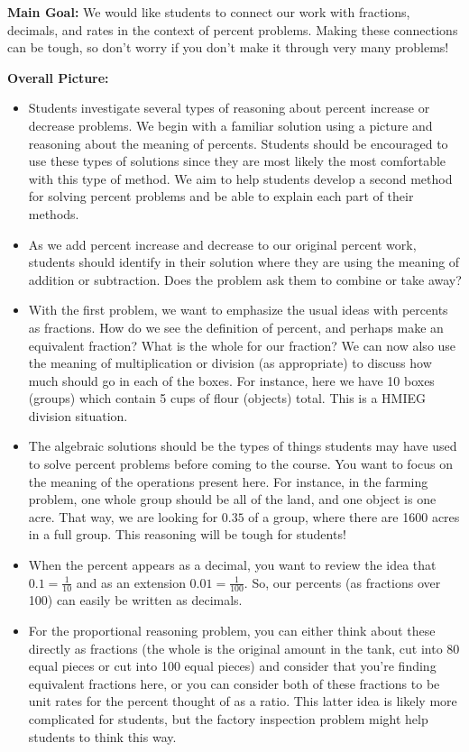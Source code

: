 \documentclass[noauthor,nooutcomes]{ximera}
\begin{document}
\begin{instructorNotes}
{\bf Main Goal:} We would like students to connect our work with fractions, decimals, and rates in the context of percent problems. Making these connections can be tough, so don't worry if you don't make it through very many problems!

{\bf Overall Picture:}
\begin{itemize}
	\item Students investigate several types of reasoning about percent increase or decrease problems. We begin with a familiar solution using a picture and reasoning about the meaning of percents. Students should be encouraged to use these types of solutions since they are most likely the most comfortable with this type of method. We aim to help students develop a second method for solving percent problems and be able to explain each part of their methods.
	\item As we add percent increase and decrease to our original percent work, students should identify in their solution where they are using the meaning of addition or subtraction. Does the problem ask them to combine or take away?
	\item With the first problem, we want to emphasize the usual ideas with percents as fractions. How do we see the definition of percent, and perhaps make an equivalent fraction? What is the whole for our fraction? We can now also use the meaning of multiplication or division (as appropriate) to discuss how much should go in each of the boxes. For instance, here we have 10 boxes (groups) which contain 5 cups of flour (objects) total. This is a HMIEG division situation.
	\item The algebraic solutions should be the types of things students may have used to solve percent problems before coming to the course. You want to focus on the meaning of the operations present here. For instance, in the farming problem, one whole group should be all of the land, and one object is one acre. That way, we are looking for $0.35$ of a group, where there are 1600 acres in a full group. This reasoning will be tough for students!
	\item When the percent appears as a decimal, you want to review the idea that $0.1 = \frac{1}{10}$ and as an extension $0.01 = \frac{1}{100}$. So, our percents (as fractions over 100) can easily be written as decimals.
	\item For the proportional reasoning problem, you can either think about these directly as fractions (the whole is the original amount in the tank, cut into 80 equal pieces or cut into 100 equal pieces) and consider that you're finding equivalent fractions here, or you can consider both of these fractions to be unit rates for the percent thought of as a ratio. This latter idea is likely more complicated for students, but the factory inspection problem might help students to think this way.

\end{itemize}
\end{instructorNotes}
\end{document}
